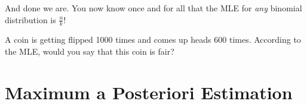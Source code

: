 And done we are. You now know once and for all that the MLE for \emph{any} binomial distribution is $ \frac{n}{k} $!

\begin{Exercise}
A coin is getting flipped 1000 times and comes up heads 600 times. According to the MLE, would you say that this coin is fair?
\end{Exercise}


\section{Maximum a Posteriori Estimation}

